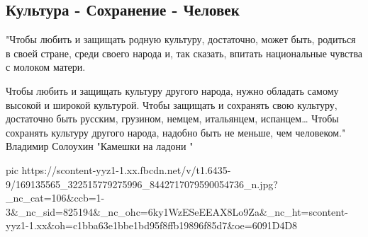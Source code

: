  
 
 
 
 

\subsection{Культура - Сохранение - Человек}
\label{sec:06_04_2021.fb.maslov_evgenij.1.kultura_chelovek}

"Чтобы любить и защищать родную культуру, достаточно, может быть, родиться в
своей стране, среди своего народа и, так сказать, впитать национальные
чувства с молоком матери.

Чтобы любить и защищать культуру другого народа, нужно обладать самому высокой и широкой культурой.
Чтобы защищать и сохранять свою культуру, достаточно быть русским, грузином, немцем, итальянцем, испанцем…
Чтобы сохранять культуру другого народа, надобно быть не меньше, чем человеком."
Владимир Солоухин 
"Камешки на ладони "


\ifcmt
  pic https://scontent-yyz1-1.xx.fbcdn.net/v/t1.6435-9/169135565_322515779275996_8442717079590054736_n.jpg?_nc_cat=106&ccb=1-3&_nc_sid=825194&_nc_ohc=6ky1WzESeEEAX8Lo9Za&_nc_ht=scontent-yyz1-1.xx&oh=c1bba63e1bbe1bd95f8ffb19896f85d7&oe=6091D4D8
\fi

